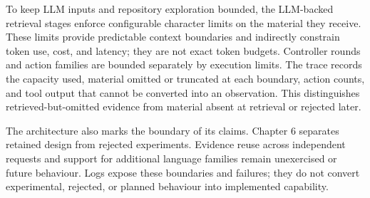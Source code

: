 To keep LLM inputs and repository exploration bounded, the LLM-backed retrieval stages enforce configurable character limits on the material they receive. These limits provide predictable context boundaries and indirectly constrain token use, cost, and latency; they are not exact token budgets. Controller rounds and action families are bounded separately by execution limits. The trace records the capacity used, material omitted or truncated at each boundary, action counts, and tool output that cannot be converted into an observation. This distinguishes retrieved-but-omitted evidence from material absent at retrieval or rejected later.

The architecture also marks the boundary of its claims. Chapter 6 separates retained design from rejected experiments. Evidence reuse across independent requests and support for additional language families remain unexercised or future behaviour. Logs expose these boundaries and failures; they do not convert experimental, rejected, or planned behaviour into implemented capability.
